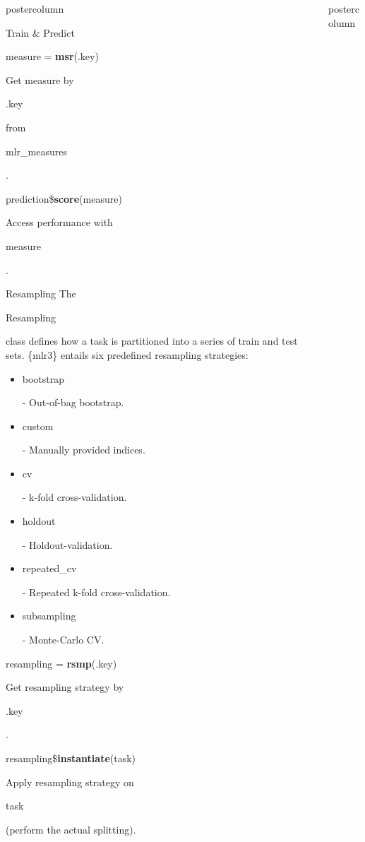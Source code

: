 \documentclass{beamer}
\newlength{\columnheight} %
\newcommand{\codeinline}[1]{\begin{codeboxinline}#1\end{codeboxinline}}
\begin{document}
\begin{frame}[fragile]{}
\begin{columns}
\begin{column}{.245\textwidth}
\begin{beamercolorbox}[center]{postercolumn}
\begin{minipage}{.98\textwidth}
{\begin{myblock}{Train \& Predict}
\begin{codebox}
								measure = \textbf{msr}(.key)
							\end{codebox}
							Get measure by \codeinline{.key} from \codeinline{mlr\_measures}.
							\\
							\begin{codebox}
								prediction\$\textbf{score}(measure)
							\end{codebox}
							Access performance with \codeinline{measure}.
						\end{myblock}
						\begin{myblock}{Resampling}
						The \codeinline{Resampling} class defines how a task is
						partitioned into a series of train and test sets. \{mlr3\}
						entails six predefined resampling strategies:
						\\
						\begin{itemize}
							\item \codeinline{bootstrap} - Out-of-bag bootstrap.
							\item \codeinline{custom} - Manually provided indices.
							\item \codeinline{cv} - k-fold cross-validation.
							\item \codeinline{holdout} - Holdout-validation.
							\item \codeinline{repeated\_cv} - Repeated k-fold cross-validation.
							\item \codeinline{subsampling} - Monte-Carlo CV.
						\end{itemize}
						\vspace{1em}
						\begin{codebox}
							resampling = \textbf{rsmp}(.key)
						\end{codebox}
						Get resampling strategy by \codeinline{.key}.
						\\
						\begin{codebox}
							resampling\$\textbf{instantiate}(task)
						\end{codebox}
						Apply resampling strategy on \codeinline{task} (perform
						the actual splitting).
					\end{myblock}
					}
				\end{minipage}
			\end{beamercolorbox}
		\end{column}
		\begin{column}{.245\textwidth}
			\begin{beamercolorbox}[center]{postercolumn}
				\begin{minipage}{.98\textwidth}
					\parbox[t][\columnheight]{\textwidth}{
}
\end{minipage}
\end{beamercolorbox}
\end{column}
\end{columns}
\end{frame}
\end{document}
